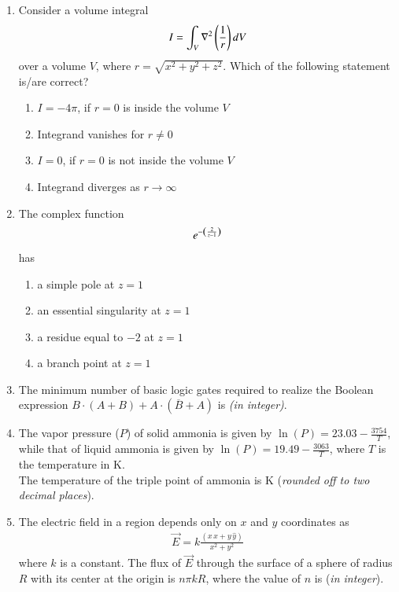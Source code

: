 \documentclass[journal,12pt,onecolumn]{IEEEtran}
\theoremstyle{remark}
\begin{document}
\begin{enumerate}
\item Consider a volume integral
\begin{align*}
    I = \int_V \nabla^2\left(\frac{1}{r}\right) dV
\end{align*}
over a volume $V$, where $r = \sqrt{x^2 + y^2 + z^2}$. Which of the following statement is/are correct?
\begin{enumerate}
    \item $I = -4\pi$, if $r = 0$ is inside the volume $V$
    \item Integrand vanishes for $r \neq 0$
    \item $I = 0$, if $r = 0$ is not inside the volume $V$
    \item Integrand diverges as $r \rightarrow \infty$
\end{enumerate}
\item The complex function
\begin{align*}
e^{-\left(\frac{2}{z-1}\right)}
\end{align*}
has \underline{\hspace{2cm}}
\begin{enumerate}
    \item a simple pole at $z=1$
    \item an essential singularity at $z=1$
    \item a residue equal to $-2$ at $z=1$
    \item a branch point at $z=1$
\end{enumerate}
\item
The minimum number of basic logic gates required to realize the Boolean expression $B \cdot (A + B) + A \cdot (\overline{B} + A)$ is \underline{\hspace{2cm}} \textit{(in integer)}.
\item
The vapor pressure ($P$) of solid ammonia is given by $\ln(P) = 23.03 - \frac{3754}{T}$, while that of liquid ammonia is given by $\ln(P) = 19.49 - \frac{3063}{T}$, where $T$ is the temperature in K. \\
The temperature of the triple point of ammonia is \underline{\hspace{2cm}} K (\textit{rounded off to two decimal places}).

\item
The electric field in a region depends only on $x$ and $y$ coordinates as
\begin{align*}
    \vec{E} = k \frac{(x\, \hat{x} + y\, \hat{y})}{x^2 + y^2}
\end{align*}
where $k$ is a constant. The flux of $\vec{E}$ through the surface of a sphere of radius $R$ with its center at the origin is $n\pi k R$, where the value of $n$ is \underline{\hspace{2cm}} (\textit{in integer}).


\end{enumerate}
\end{document}
